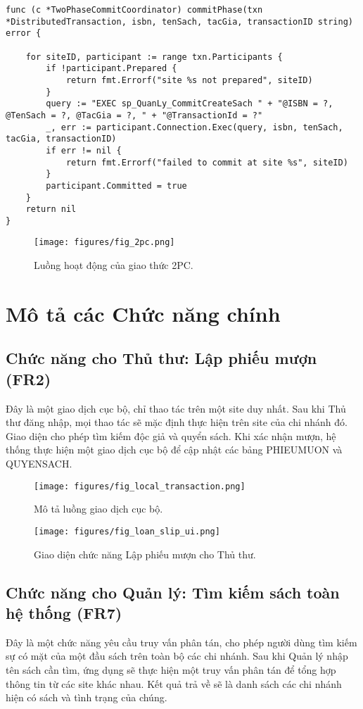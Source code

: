 \documentclass[conference]{IEEEtran}
\begin{document}
\begin{Verbatim}[fontsize=\footnotesize,breaklines=true,breakanywhere=true]
func (c *TwoPhaseCommitCoordinator) commitPhase(txn *DistributedTransaction, isbn, tenSach, tacGia, transactionID string) error {
    
    for siteID, participant := range txn.Participants {
        if !participant.Prepared {
            return fmt.Errorf("site %s not prepared", siteID)
        }
        query := "EXEC sp_QuanLy_CommitCreateSach " + "@ISBN = ?, @TenSach = ?, @TacGia = ?, " + "@TransactionId = ?"
        _, err := participant.Connection.Exec(query, isbn, tenSach, tacGia, transactionID)
        if err != nil {
            return fmt.Errorf("failed to commit at site %s", siteID)
        }
        participant.Committed = true
    }
    return nil
}
\end{Verbatim}

\begin{figure}[H]
\centering
\texttt{[image: figures/fig\_2pc.png]} 
\caption{Luồng hoạt động của giao thức 2PC.}
\label{fig_2pc}
\end{figure}

\section{Mô tả các Chức năng chính}
\subsection{Chức năng cho Thủ thư: Lập phiếu mượn (FR2)}
Đây là một giao dịch cục bộ, chỉ thao tác trên một site duy nhất. Sau khi Thủ thư đăng nhập, mọi thao tác sẽ mặc định thực hiện trên site của chi nhánh đó. Giao diện cho phép tìm kiếm độc giả và quyển sách. Khi xác nhận mượn, hệ thống thực hiện một giao dịch cục bộ để cập nhật các bảng PHIEUMUON và QUYENSACH.

\begin{figure}[H]
\centering
\texttt{[image: figures/fig\_local\_transaction.png]} 
\caption{Mô tả luồng giao dịch cục bộ.}
\label{fig_local_transaction}
\end{figure}

\begin{figure}[H]
\centering
\texttt{[image: figures/fig\_loan\_slip\_ui.png]} 
\caption{Giao diện chức năng Lập phiếu mượn cho Thủ thư.}
\label{fig_loan_slip_ui}
\end{figure}

\subsection{Chức năng cho Quản lý: Tìm kiếm sách toàn hệ thống (FR7)}
Đây là một chức năng yêu cầu truy vấn phân tán, cho phép người dùng tìm kiếm sự có mặt của một đầu sách trên toàn bộ các chi nhánh. Sau khi Quản lý nhập tên sách cần tìm, ứng dụng sẽ thực hiện một truy vấn phân tán để tổng hợp thông tin từ các site khác nhau. Kết quả trả về sẽ là danh sách các chi nhánh hiện có sách và tình trạng của chúng.
\end{document}
